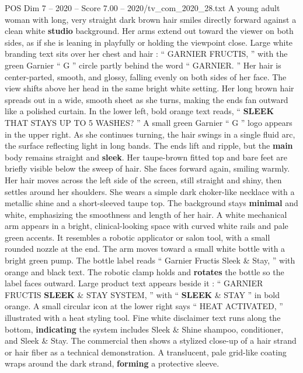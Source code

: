 \begin{textsample}{POS Dim 7 – 2020 – Score 7.00 – 2020/tv\_com\_2020\_28.txt}  \label{ex:f7_pos_084}
A young adult woman with long, very straight dark brown hair smiles directly forward against a clean white \textbf{studio} background.
Her arms extend out toward the viewer on both sides, as if she is leaning in playfully or holding the viewpoint close.
Large white branding text sits over her chest and hair : “ GARNIER FRUCTIS, ” with the green Garnier “ G ” circle partly behind the word “ GARNIER. ” Her hair is center-parted, smooth, and glossy, falling evenly on both sides of her face.
The view shifts above her head in the same bright white setting.
Her long brown hair spreads out in a wide, smooth sheet as she turns, making the ends fan outward like a polished curtain.
In the lower left, bold orange text reads, “ \textbf{SLEEK} THAT STAYS UP TO 5 WASHES? ” A small green Garnier “ G ” logo appears in the upper right.
As she continues turning, the hair swings in a single fluid arc, the surface reflecting light in long bands.
The ends lift and ripple, but the \textbf{main} body remains straight and \textbf{sleek}.
Her taupe-brown fitted top and bare feet are briefly visible below the sweep of hair.
She faces forward again, smiling warmly.
Her hair moves across the left side of the screen, still straight and shiny, then settles around her shoulders.
She wears a simple dark choker-like necklace with a metallic shine and a short-sleeved taupe top.
The background stays \textbf{minimal} and white, emphasizing the smoothness and length of her hair.
A white mechanical arm appears in a bright, clinical-looking space with curved white rails and pale green accents.
It resembles a robotic applicator or salon tool, with a small rounded nozzle at the end.
The arm moves toward a small white bottle with a bright green pump.
The bottle label reads “ Garnier Fructis Sleek \& Stay, ” with orange and black text.
The robotic clamp holds and \textbf{rotates} the bottle so the label faces outward.
Large product text appears beside it : “ GARNIER FRUCTIS \textbf{SLEEK} \& STAY SYSTEM, ” with “ \textbf{SLEEK} \& STAY ” in bold orange.
A small circular icon at the lower right says “ HEAT ACTIVATED, ” illustrated with a heat styling tool.
Fine white disclaimer text runs along the bottom, \textbf{indicating} the system includes Sleek \& Shine shampoo, conditioner, and Sleek \& Stay.
The commercial then shows a stylized close-up of a hair strand or hair fiber as a technical demonstration.
A translucent, pale grid-like coating wraps around the dark strand, \textbf{forming} a protective sleeve.

\end{textsample}
